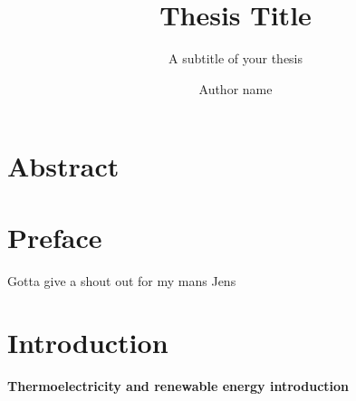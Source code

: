 \documentclass[UKenglish]{ifimaster}  %
\title{Thesis Title}        %
\subtitle{A subtitle of your thesis }         %
\author{Author name}                      %
\begin{document}
\duoforside[dept={Department Name <change at main.tex>},   %
  program={Master's Program Name <change at main.tex>},  %
  long]                                        %

\frontmatter{}  
\chapter*{Abstract}                   %

\tableofcontents{}
\listoffigures{}
\listoftables{}

\chapter*{Preface}                    %

Gotta give a shout out for my mans Jens

\mainmatter{}

\chapter{Introduction}                  %

\textbf{Thermoelectricity and renewable energy introduction}
\end{document}
